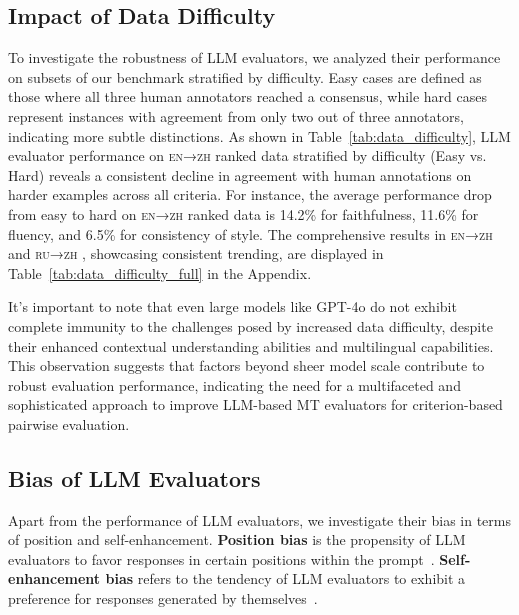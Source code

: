 \documentclass{article}
\theoremstyle{plain}
\theoremstyle{definition}
\theoremstyle{remark}
\newcommand{\enzh}{\textsc{en→zh} }
\newcommand{\ruzh}{\textsc{ru→zh} }
\begin{document}
\subsection{Impact of Data Difficulty}
To investigate the robustness of LLM evaluators, we analyzed their performance on subsets of our benchmark stratified by difficulty. Easy cases are defined as those where all three human annotators reached a consensus, while hard cases represent instances with agreement from only two out of three annotators, indicating more subtle distinctions.
As shown in Table~\ref{tab:data_difficulty}, LLM evaluator performance on \enzh ranked data stratified by difficulty (Easy vs. Hard) reveals a consistent decline in agreement with human annotations on harder examples across all criteria. For instance, the average performance drop from easy to hard on \enzh ranked data is 14.2\% for faithfulness, 11.6\% for fluency, and 6.5\% for consistency of style. The comprehensive results in \enzh and \ruzh, showcasing consistent trending, are displayed in Table~\ref{tab:data_difficulty_full} in the Appendix.  

It's important to note that even large models like GPT-4o do not exhibit complete immunity to the challenges posed by increased data difficulty, despite their enhanced contextual understanding abilities and multilingual capabilities. This observation suggests that factors beyond sheer model scale contribute to robust evaluation performance, indicating the need for a multifaceted and sophisticated approach to improve LLM-based MT evaluators for criterion-based pairwise evaluation.



\subsection{Bias of LLM Evaluators}
\label{sec:evaluator bias}
Apart from the performance of LLM evaluators, we investigate their bias in terms of position and self-enhancement. \textbf{Position bias} is the propensity of LLM evaluators to favor responses in certain positions within the prompt~\citep{Park2024OffsetBiasLD}. \textbf{Self-enhancement bias} refers to the tendency of LLM evaluators to exhibit a preference for responses generated by themselves~\citep{Ye2024JusticeOP}. 
\end{document}
